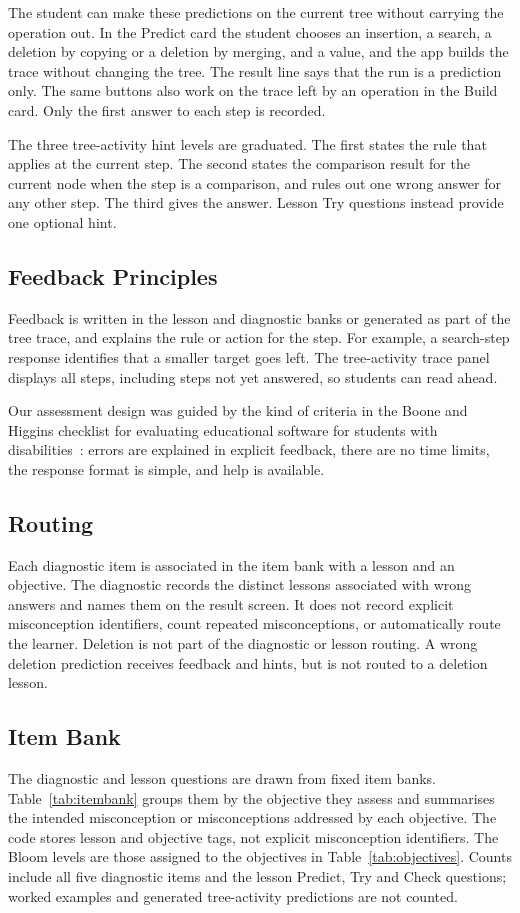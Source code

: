 The student can make these predictions on the current tree without carrying the operation out. In the Predict card the student chooses an insertion, a search, a deletion by copying or a deletion by merging, and a value, and the app builds the trace without changing the tree. The result line says that the run is a prediction only. The same buttons also work on the trace left by an operation in the Build card. Only the first answer to each step is recorded.

The three tree-activity hint levels are graduated. The first states the rule that applies at the current step. The second states the comparison result for the current node when the step is a comparison, and rules out one wrong answer for any other step. The third gives the answer. Lesson Try questions instead provide one optional hint.

\subsection{Feedback Principles}
Feedback is written in the lesson and diagnostic banks or generated as part of the tree trace, and explains the rule or action for the step. For example, a search-step response identifies that a smaller target goes left. The tree-activity trace panel displays all steps, including steps not yet answered, so students can read ahead.

Our assessment design was guided by the kind of criteria in the Boone and
Higgins checklist for evaluating educational software for students with
disabilities~\cite{article}: errors are explained in explicit feedback,
there are no time limits, the response format is simple, and help is
available.

\subsection{Routing}
Each diagnostic item is associated in the item bank with a lesson and an objective. The diagnostic records the distinct lessons associated with wrong answers and names them on the result screen. It does not record explicit misconception identifiers, count repeated misconceptions, or automatically route the learner. Deletion is not part of the diagnostic or lesson routing. A wrong deletion prediction receives feedback and hints, but is not routed to a deletion lesson.

\subsection{Item Bank}
The diagnostic and lesson questions are drawn from fixed item banks. Table~\ref{tab:itembank} groups them by the objective they assess and summarises the intended misconception or misconceptions addressed by each objective. The code stores lesson and objective tags, not explicit misconception identifiers. The Bloom levels are those assigned to the objectives in Table~\ref{tab:objectives}. Counts include all five diagnostic items and the lesson Predict, Try and Check questions; worked examples and generated tree-activity predictions are not counted.

